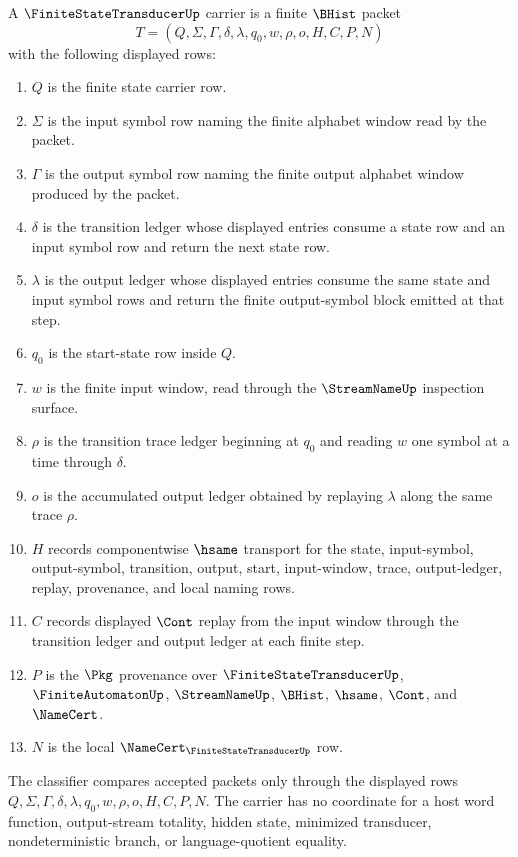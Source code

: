 \begin{definition}
\label{def:finite-state-transducer-carrier}
A $\FiniteStateTransducerUp$ carrier is a finite $\BHist$ packet
$$
T=(Q,\Sigma,\Gamma,\delta,\lambda,q_0,w,\rho,o,H,C,P,N)
$$
with the following displayed rows:
\begin{enumerate}
\item $Q$ is the finite state carrier row.
\item $\Sigma$ is the input symbol row naming the finite alphabet window read by the packet.
\item $\Gamma$ is the output symbol row naming the finite output alphabet window produced by the packet.
\item $\delta$ is the transition ledger whose displayed entries consume a state row and an input symbol row and return the next state row.
\item $\lambda$ is the output ledger whose displayed entries consume the same state and input symbol rows and return the finite output-symbol block emitted at that step.
\item $q_0$ is the start-state row inside $Q$.
\item $w$ is the finite input window, read through the $\StreamNameUp$ inspection surface.
\item $\rho$ is the transition trace ledger beginning at $q_0$ and reading $w$ one symbol at a time through $\delta$.
\item $o$ is the accumulated output ledger obtained by replaying $\lambda$ along the same trace $\rho$.
\item $H$ records componentwise $\hsame$ transport for the state, input-symbol, output-symbol, transition, output, start, input-window, trace, output-ledger, replay, provenance, and local naming rows.
\item $C$ records displayed $\Cont$ replay from the input window through the transition ledger and output ledger at each finite step.
\item $P$ is the $\Pkg$ provenance over $\FiniteStateTransducerUp$, $\FiniteAutomatonUp$, $\StreamNameUp$, $\BHist$, $\hsame$, $\Cont$, and $\NameCert$.
\item $N$ is the local $\NameCert_{\FiniteStateTransducerUp}$ row.
\end{enumerate}
The classifier compares accepted packets only through the displayed rows $Q,\Sigma,\Gamma,\delta,\lambda,q_0,w,\rho,o,H,C,P,N$. The carrier has no coordinate for a host word function, output-stream totality, hidden state, minimized transducer, nondeterministic branch, or language-quotient equality.
\end{definition}

